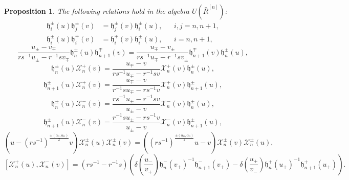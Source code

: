 \documentclass[10pt,a4paper]{amsart}
\newtheorem{proposition}[theorem]{Proposition}
\numberwithin{equation}{section}
\begin{document}
 	\begin{proposition}\label{p:23}	
 		 The following relations hold in the algebra $U\left(\bar{R}^{[n]}\right)$:
 		 $$
 		 \begin{aligned}
 		 	\mathfrak{h}_i^{ \pm}(u) \mathfrak{h}_j^{ \pm}(v) & =\mathfrak{h}_j^{ \pm}(v) \mathfrak{h}_i^{ \pm}(u), & & i, j=n, n+1, \\
 		 	\mathfrak{h}_i^{ \pm}(u) \mathfrak{h}_i^{\mp}(v) & =\mathfrak{h}_i^{\mp}(v) \mathfrak{h}_i^{ \pm}(u), & & i=n, n+1,
 		 \end{aligned}
 		 $$
 		 $$
 		 \frac{u_{ \pm}-v_{\mp}}{r s^{-1} u_{ \pm}-r^{-1} s v_{\mp}} \mathfrak{h}_n^{ \pm}(u) \mathfrak{h}_{n+1}^{\mp}(v)=\frac{u_{\mp}-v_{ \pm}}{r s^{-1} u_{\mp}-r^{-1} s v_{ \pm}} \mathfrak{h}_{n+1}^{\mp}(v) \mathfrak{h}_n^{ \pm}(u),
 		 $$
 		 $$
 		 \mathfrak{h}_n^{ \pm}(u) \mathcal{X}_n^{+}(v)=\frac{u_{\mp}-v}{r s^{-1} u_{\mp}-r^{-1} s v} \mathcal{X}_n^{+}(v) \mathfrak{h}_n^{ \pm}(u),
 		 $$
 		 $$
 		 \mathfrak{h}_{n+1}^{ \pm}(u) \mathcal{X}_n^{+}(v)=\frac{u_{\mp}-v}{r^{-1} s u_{\mp}-r s^{-1} v} \mathcal{X}_n^{+}(v) \mathfrak{h}_{n+1}^{ \pm}(u),
 		 $$
 		 $$
 		 \mathfrak{h}_n^{ \pm}(u) \mathcal{X}_n^{-}(v)=\frac{r s^{-1} u_{ \pm}-r^{-1} s v}{u_{ \pm}-v} \mathcal{X}_n^{-}(v) \mathfrak{h}_n^{ \pm}(u),
 		 $$
 		 $$
 		 \mathfrak{h}_{n+1}^{ \pm}(u) \mathcal{X}_n^{-}(v)=\frac{r^{-1} s u_{ \pm}-r s^{-1} v}{u_{ \pm}-v} \mathcal{X}_n^{-}(v) \mathfrak{h}_{n+1}^{ \pm}(u),
 		 $$
 		 $$
 		 (u-(r s^{-1})^{\frac{ \pm(\alpha_n, \alpha_n)}{2}} v) \mathcal{X}_n^{ \pm}(u) \mathcal{X}_n^{ \pm}(v)=((r s^{-1})^{\frac{ \pm(\alpha_n, \alpha_n)}{2}} u-v) \mathcal{X}_n^{ \pm}(v) \mathcal{X}_n^{ \pm}(u),
 		 $$
 		 $$
 		 \left[\mathcal{X}_n^{+}(u), \mathcal{X}_n^{-}(v)\right]=\left(r s^{-1}-r^{-1} s\right)\left(\delta\left(\frac{u_{-}}{v_{+}}\right) \mathfrak{h}_n^{-}\left(v_{+}\right)^{-1} \mathfrak{h}_{n+1}^{-}\left(v_{+}\right)-\delta\left(\frac{u_{+}}{v_{-}}\right) \mathfrak{h}_n^{+}\left(u_{+}\right)^{-1} \mathfrak{h}_{n+1}^{+}\left(u_{+}\right)\right).
 		 $$
 			\end{proposition}	
\end{document}
